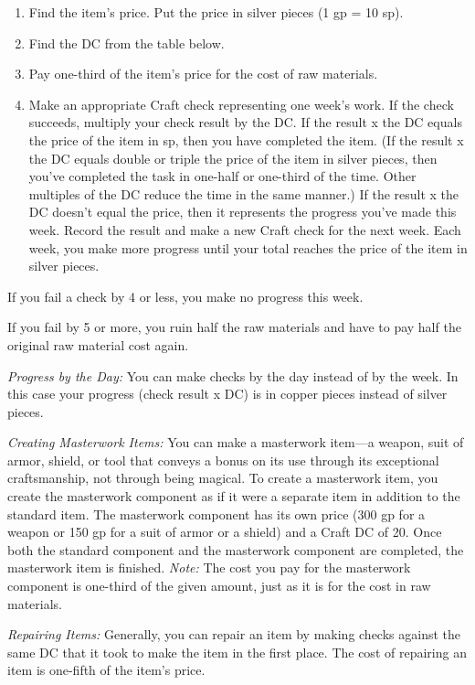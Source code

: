 \begin{enumerate}
\item Find the item's price. Put the price in silver pieces (1 gp = 10 sp).
\item Find the DC from the table below.
\item Pay one-third of the item's price for the cost of raw materials.
\item Make an appropriate Craft check representing one week's work. If the check succeeds, 
multiply your check result by the DC. If the result x the DC 
equals the price of the item in sp, then you have completed the item. (If the result 
x the DC equals double or triple the price of the item in silver 
pieces, then you've completed the task in one-half or one-third of the time. Other 
multiples of the DC reduce the time in the same manner.) If the result x 
the DC doesn't equal the price, then it represents the progress you've made this 
week. Record the result and make a new Craft check for the next week. Each week, 
you make more progress until your total reaches the price of the item in silver 
pieces.
\end{enumerate}

If you fail a check by 4 or less, you make no progress this week.

If you fail by 5 or more, you ruin half the raw materials and have to pay half 
the original raw material cost again.

\textit{Progress by the Day:} You can make checks by the day instead of by the 
week. In this case your progress (check result x DC) is in copper 
pieces instead of silver pieces.

\textit{Creating Masterwork Items:} You can make a masterwork item---a weapon, 
suit of armor, shield, or tool that conveys a bonus on its use through its exceptional 
craftsmanship, not through being magical. To create a masterwork item, you create 
the masterwork component as if it were a separate item in addition to the standard 
item. The masterwork component has its own price (300 gp for a weapon or 150 gp 
for a suit of armor or a shield) and a Craft DC of 20. Once both the standard component 
and the masterwork component are completed, the masterwork item is finished. \textit{Note:} The cost you pay for the masterwork component is one-third of the given amount, 
just as it is for the cost in raw materials.

\textit{Repairing Items:} Generally, you can repair an item by making checks against 
the same DC that it took to make the item in the first place. The cost of repairing 
an item is one-fifth of the item's price. 

